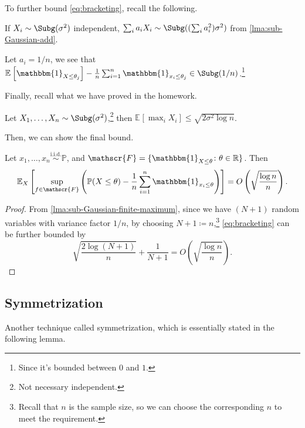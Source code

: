 To further bound \autoref{eq:bracketing}, recall the following.

\begin{prev}
	If \(X_i \sim \Subg(\sigma ^2) \) independent, \(\sum_{i} a_i X_i \sim \Subg((\sum_{i} a_i^2) \sigma ^2) \) from \autoref{lma:sub-Gaussian-add}.
\end{prev}

\begin{remark}
	Let \(a_i = 1/n\), we see that \(\mathbb{E}_{}\left[\mathbbm{1}_{X \leq \theta _j}\right] - \frac{1}{n} \sum_{i=1}^{n} \mathbbm{1}_{x_i \leq \theta _j} \in \Subg(1 / n) \).\footnote{Since it's bounded between \(0\) and \(1\).}
\end{remark}

Finally, recall what we have proved in the homework.

\begin{lemma}\label{lma:sub-Gaussian-finite-maximum}
	Let \(X_1, \dots , X_n \sim \Subg(\sigma ^{2} ) \),\footnote{Not necessary independent.} then \(\mathbb{E}_{}\left[\max _i X_i \right] \leq \sqrt{2 \sigma ^{2} \log n}\).
\end{lemma}

Then, we can show the final bound.

\begin{proposition}[Bracketing]\label{prop:bracketing}
	Let \(x_1, \dots , x_n \overset{\text{i.i.d.} }{\sim } \mathbb{P} \), and \(\mathscr{F} = \{ \mathbbm{1}_{X \leq \theta} \colon \theta \in \mathbb{R} \} \). Then
	\[
		\mathbb{E}_{X}\left[ \sup _{f\in \mathscr{F} } \left( \mathbb{P} (X \leq \theta ) - \frac{1}{n}\sum_{i=1}^{n} \mathbbm{1}_{x_i \leq \theta } \right) \right] = O\left( \sqrt{\frac{\log n}{n}}  \right).
	\]
\end{proposition}
\begin{proof}
	From \autoref{lma:sub-Gaussian-finite-maximum}, since we have \((N+1)\) random variables with variance factor \(1 / n\), by choosing \(N+1 \coloneqq n\),\footnote{Recall that \(n\) is the sample size, so we can choose the corresponding \(n\) to meet the requirement.} \autoref{eq:bracketing} can be further bounded by
	\[
		\sqrt{\frac{2 \log (N+1)}{n}} + \frac{1}{N+1} = O\left( \sqrt{\frac{\log n}{n}}  \right).
	\]
\end{proof}
\subsection{Symmetrization}
Another technique called symmetrization, which is essentially stated in the following lemma.

